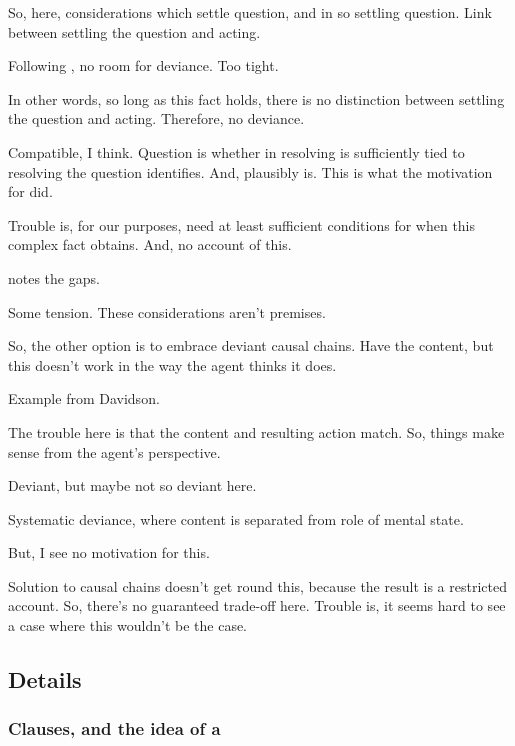 \begin{note}
  So, here, considerations which settle question, and in so settling question.
  Link between settling the question and acting.

  Following \citeauthor{Hieronymi:2011aa}, no room for deviance.
  Too tight.

  In other words, so long as this fact holds, there is no distinction between settling the question and acting.
  Therefore, no deviance.

  Compatible, I think.
  Question is whether in resolving \qzS{} is sufficiently tied to resolving the question \citeauthor{Hieronymi:2011aa} identifies.
  And, plausibly is.
  This is what the motivation for \qzS{} did.

  Trouble is, for our purposes, need at least sufficient conditions for when this complex fact obtains.
  And, no account of this.

  \citeauthor{Hieronymi:2011aa} notes the gaps.

  Some tension.
  These considerations aren't premises.
\end{note}

\begin{note}
  So, the other option is to embrace deviant causal chains.
  Have the content, but this doesn't work in the way the agent thinks it does.

  Example from Davidson.

  The trouble here is that the content and resulting action match.
  So, things make sense from the agent's perspective.

  Deviant, but maybe not so deviant here.

  Systematic deviance, where content is separated from role of mental state.

  But, I see no motivation for this.

  Solution to causal chains doesn't get round this, because the result is a restricted account.
  So, there's no guaranteed trade-off here.
  Trouble is, it seems hard to see a case where this wouldn't be the case.
\end{note}


\subsection{Details}
\label{cha:zS:sec:details}

\subsubsection{Clauses, and the idea of a }
\label{cha:zS:sec:clauses-idea-requ1}

